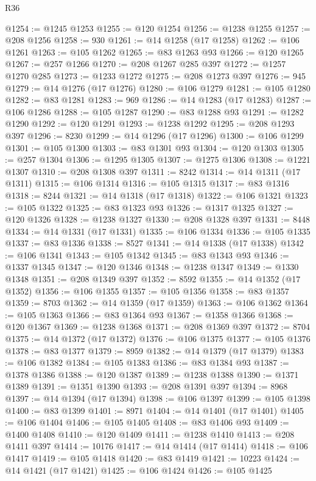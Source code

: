 \begin{lexlean}{R36}
\begin{coremodule}
@1254 := @1245 @1253
@1255 := @120 @1254
@1256 := @1238 @1255
@1257 := @208 @1256
@1258 := 930
@1261 := @14 @1258 (@17 @1258)
@1262 := @106 @1261
@1263 := @105 @1262
@1265 := @83 @1263 @93
@1266 := @120 @1265
@1267 := @257 @1266
@1270 := @208 @1267 @285 @397
@1272 := @1257 @1270 @285
@1273 := @1233 @1272
@1275 := @208 @1273 @397
@1276 := 945
@1279 := @14 @1276 (@17 @1276)
@1280 := @106 @1279
@1281 := @105 @1280
@1282 := @83 @1281
@1283 := 969
@1286 := @14 @1283 (@17 @1283)
@1287 := @106 @1286
@1288 := @105 @1287
@1290 := @83 @1288 @93
@1291 := @1282 @1290
@1292 := @120 @1291
@1293 := @1238 @1292
@1295 := @208 @1293 @397
@1296 := 8230
@1299 := @14 @1296 (@17 @1296)
@1300 := @106 @1299
@1301 := @105 @1300
@1303 := @83 @1301 @93
@1304 := @120 @1303
@1305 := @257 @1304
@1306 := @1295 @1305
@1307 := @1275 @1306
@1308 := @1221 @1307
@1310 := @208 @1308 @397
@1311 := 8242
@1314 := @14 @1311 (@17 @1311)
@1315 := @106 @1314
@1316 := @105 @1315
@1317 := @83 @1316
@1318 := 8244
@1321 := @14 @1318 (@17 @1318)
@1322 := @106 @1321
@1323 := @105 @1322
@1325 := @83 @1323 @93
@1326 := @1317 @1325
@1327 := @120 @1326
@1328 := @1238 @1327
@1330 := @208 @1328 @397
@1331 := 8448
@1334 := @14 @1331 (@17 @1331)
@1335 := @106 @1334
@1336 := @105 @1335
@1337 := @83 @1336
@1338 := 8527
@1341 := @14 @1338 (@17 @1338)
@1342 := @106 @1341
@1343 := @105 @1342
@1345 := @83 @1343 @93
@1346 := @1337 @1345
@1347 := @120 @1346
@1348 := @1238 @1347
@1349 := @1330 @1348
@1351 := @208 @1349 @397
@1352 := 8592
@1355 := @14 @1352 (@17 @1352)
@1356 := @106 @1355
@1357 := @105 @1356
@1358 := @83 @1357
@1359 := 8703
@1362 := @14 @1359 (@17 @1359)
@1363 := @106 @1362
@1364 := @105 @1363
@1366 := @83 @1364 @93
@1367 := @1358 @1366
@1368 := @120 @1367
@1369 := @1238 @1368
@1371 := @208 @1369 @397
@1372 := 8704
@1375 := @14 @1372 (@17 @1372)
@1376 := @106 @1375
@1377 := @105 @1376
@1378 := @83 @1377
@1379 := 8959
@1382 := @14 @1379 (@17 @1379)
@1383 := @106 @1382
@1384 := @105 @1383
@1386 := @83 @1384 @93
@1387 := @1378 @1386
@1388 := @120 @1387
@1389 := @1238 @1388
@1390 := @1371 @1389
@1391 := @1351 @1390
@1393 := @208 @1391 @397
@1394 := 8968
@1397 := @14 @1394 (@17 @1394)
@1398 := @106 @1397
@1399 := @105 @1398
@1400 := @83 @1399
@1401 := 8971
@1404 := @14 @1401 (@17 @1401)
@1405 := @106 @1404
@1406 := @105 @1405
@1408 := @83 @1406 @93
@1409 := @1400 @1408
@1410 := @120 @1409
@1411 := @1238 @1410
@1413 := @208 @1411 @397
@1414 := 10176
@1417 := @14 @1414 (@17 @1414)
@1418 := @106 @1417
@1419 := @105 @1418
@1420 := @83 @1419
@1421 := 10223
@1424 := @14 @1421 (@17 @1421)
@1425 := @106 @1424
@1426 := @105 @1425

\end{coremodule}
\end{lexlean}
